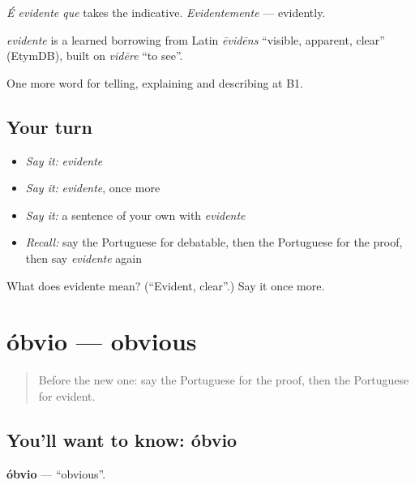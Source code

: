 \emph{É evidente que} takes the indicative. \emph{Evidentemente} — evidently.

\begin{cousinweb}
\emph{evidente} is a learned borrowing from Latin \emph{ēvidēns} \textquotedblleft{}visible, apparent, clear\textquotedblright{} (EtymDB), built on \emph{vidēre} \textquotedblleft{}to see\textquotedblright{}.
\end{cousinweb}

\begin{grammarlens}[title={What you've built}]
One more word for telling, explaining and describing at B1.
\end{grammarlens}

\subsection*{Your turn}
\begin{itemize}
\raggedright
  \item \emph{Say it:} \emph{evidente}
  \item \emph{Say it:} \emph{evidente}, once more
  \item \emph{Say it:} a sentence of your own with \emph{evidente}
  \item \emph{Recall:} say the Portuguese for debatable, then the Portuguese for the proof, then say \emph{evidente} again
\end{itemize}

\begin{tcolorbox}[breakable,colback=teal!4,colframe=teal!35!black,title={Before you move on}]
What does evidente mean? (\textquotedblleft{}Evident, clear\textquotedblright{}.) Say it once more.
\end{tcolorbox}
\section[óbvio]{óbvio — obvious}

\label{lesson:PT-C341-obvio}



\begin{quote}
Before the new one: say the Portuguese for the proof, then the Portuguese for evident.
\end{quote}

\subsection*{You'll want to know: óbvio}
\textbf{óbvio} — \textquotedblleft{}obvious\textquotedblright{}.

